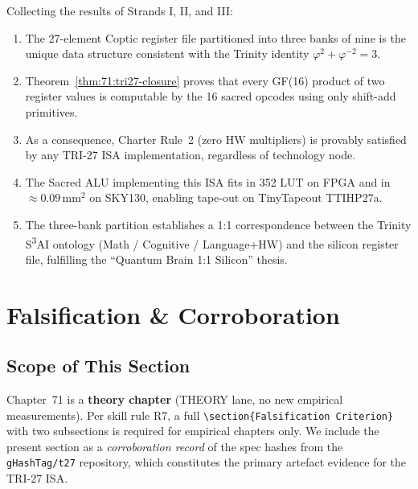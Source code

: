 Collecting the results of Strands I, II, and III:

\begin{enumerate}
  \item The 27-element Coptic register file partitioned into three
    banks of nine is the unique data structure consistent with the
    Trinity identity $\varphi^2 + \varphi^{-2} = 3$.
  \item Theorem~\ref{thm:71:tri27-closure} proves that every GF(16)
    product of two register values is computable by the 16 sacred
    opcodes using only shift-add primitives.
  \item As a consequence, Charter Rule~2 (zero HW multipliers) is
    provably satisfied by any TRI-27 ISA implementation, regardless
    of technology node.
  \item The Sacred ALU implementing this ISA fits in 352 LUT on FPGA
    and in $\approx 0.09\,\text{mm}^2$ on SKY130, enabling tape-out
    on TinyTapeout TTIHP27a.
  \item The three-bank partition establishes a 1:1 correspondence
    between the Trinity S\textsuperscript{3}AI ontology
    (Math / Cognitive / Language+HW) and the silicon register file,
    fulfilling the ``Quantum Brain 1:1 Silicon'' thesis.
\end{enumerate}

\section{Falsification \& Corroboration}
\label{sec:71:falsification}

\subsection{Scope of This Section}
\label{subsec:71:falsify-scope}

Chapter~71 is a \textbf{theory chapter} (THEORY lane, no new empirical
measurements).  Per skill rule R7, a full \verb|\section{Falsification Criterion}|
with two subsections is required for empirical chapters only.
We include the present section as a \emph{corroboration record} of
the spec hashes from the \texttt{gHashTag/t27} repository, which
constitutes the primary artefact evidence for the TRI-27 ISA.

